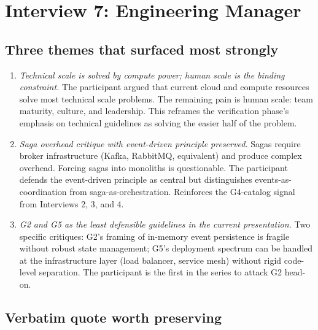 
\section{Interview 7: Engineering Manager}
\label{sec:interview07}

\subsection*{Three themes that surfaced most strongly}

\begin{enumerate}[itemsep=3pt,topsep=2pt]
  \item \emph{Technical scale is solved by compute power; human scale is the binding constraint.} The participant argued that current cloud and compute resources solve most technical scale problems. The remaining pain is human scale: team maturity, culture, and leadership. This reframes the verification phase's emphasis on technical guidelines as solving the easier half of the problem.
  \item \emph{Saga overhead critique with event-driven principle preserved.} Sagas require broker infrastructure (Kafka, RabbitMQ, equivalent) and produce complex overhead. Forcing sagas into monoliths is questionable. The participant defends the event-driven principle as central but distinguishes events-as-coordination from saga-as-orchestration. Reinforces the G4-catalog signal from Interviews 2, 3, and 4.
  \item \emph{G2 and G5 as the least defensible guidelines in the current presentation.} Two specific critiques: G2's framing of in-memory event persistence is fragile without robust state management; G5's deployment spectrum can be handled at the infrastructure layer (load balancer, service mesh) without rigid code-level separation. The participant is the first in the series to attack G2 head-on.
\end{enumerate}

\subsection*{Verbatim quote worth preserving}

